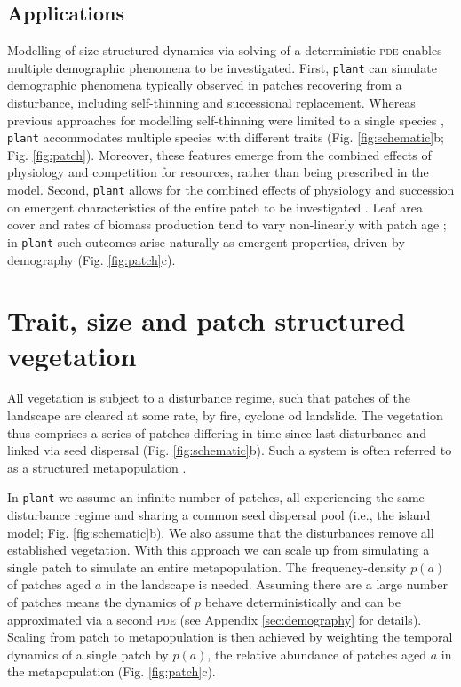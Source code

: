 \documentclass[a4paper,11pt]{article}
\newcommand{\plant}{\texttt{plant}}
\begin{document}
\subsection{Applications}

Modelling of size-structured dynamics via solving of a deterministic
\textsc{pde} enables multiple demographic phenomena to be
investigated. First, {\plant} can simulate demographic 
phenomena typically observed in patches
recovering from a disturbance, including self-thinning and
successional replacement. Whereas previous approaches for modelling
self-thinning were limited to a single species
\citep[e.g.][]{Barnes-2004, Coomes-2007}, {\plant} accommodates
multiple species with different traits (Fig. \ref{fig:schematic}b;
Fig.  \ref{fig:patch}). Moreover, these features emerge from the 
combined effects of physiology and competition for resources, rather 
than being prescribed in the model. Second, {\plant} allows for
the combined effects of physiology and succession on emergent 
characteristics of the entire patch to be investigated
\citep{Falster-2011}. Leaf area cover and rates of biomass 
production tend to vary  non-linearly with patch 
age \citep{Binkley-2002, Smith-2001, Ogawa-2010};
in {\plant} such outcomes arise naturally as emergent properties, 
driven by demography (Fig. \ref{fig:patch}c).

\section{Trait, size and patch structured vegetation}

All vegetation is subject to a disturbance regime, such that patches
of the landscape are cleared at some rate, by fire, cyclone od
landslide.  The vegetation thus comprises a series of patches
differing in time since last disturbance and linked via seed dispersal
(Fig.  \ref{fig:schematic}b). Such a system is often referred to as a
structured metapopulation \citep{Gyllenberg-2001}.

In {\plant} we assume an infinite number of patches, all experiencing
the same disturbance regime and sharing a common seed dispersal pool
(i.e., the island model; Fig. \ref{fig:schematic}b). We also assume
that the disturbances remove all established vegetation.  With this
approach we can scale up from simulating a single patch to simulate an
entire metapopulation.  The frequency-density \(p(a)\) of patches aged
\(a\) in the landscape is needed. Assuming there are a large number of
patches means the dynamics of \(p\) behave deterministically and can
be approximated via a second \textsc{pde} (see Appendix
\ref{sec:demography} for details). Scaling from patch to
metapopulation is then achieved by weighting the temporal dynamics of
a single patch by \(p(a)\), the relative abundance of patches aged
\(a\) in the metapopulation (Fig. \ref{fig:patch}c).
\end{document}
